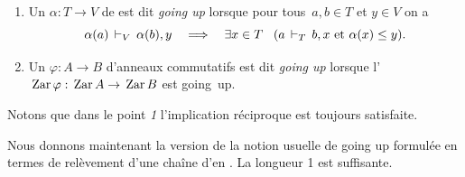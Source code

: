 \begin{definition}\label{defiGoingup}~
\begin{enumerate}
%
\item Un \homo $\alpha:T\to V$ de \trdis est dit \emph{going up}
lorsque  pour
\hbox{tous $a,b\in T$} et $y\in V$ on a
$$
\alpha(a)\,\vdash_{V}\, \alpha(b), y \quad\Longrightarrow\quad\exists x\in T\;\;\; (a \,\vdash_{T}\, b , x\hbox{ et }\alpha(x)\leq y).
$$

%
\item Un \homo $\varphi: A\to B$ d'anneaux
commutatifs est dit \emph{going up} lorsque
l'\homo  $\,{\rm Zar}\,\varphi:\,{\rm Zar}\, A\to\,{\rm Zar}\, B$ est going~up.
\end{enumerate}
\end{definition} 

Notons que dans le point \emph{1} l'implication réciproque est toujours satisfaite.

Nous donnons maintenant la version \gui{\proc} de la notion usuelle de going up formulée en termes de relèvement d'une chaîne d'\ideps en \clama. La longueur 1 est suffisante.

